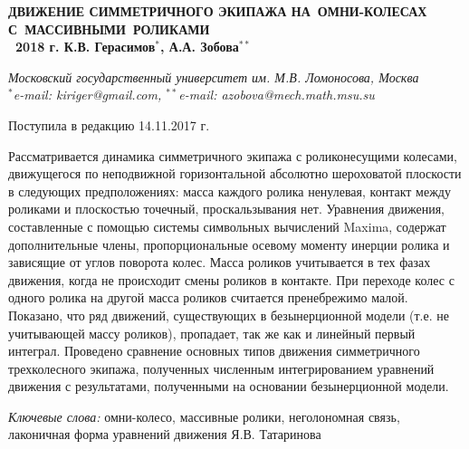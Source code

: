 \begin{center}
\large
\textbf{ ДВИЖЕНИЕ СИММЕТРИЧНОГО ЭКИПАЖА НА~ОМНИ-КОЛЕСАХ С~МАССИВНЫМИ~РОЛИКАМИ \\
\textcopyright \ 2018 г. \quad К.В. Герасимов$^{*}$, А.А. Зобова$^{**}$ }

\textit{ Московский государственный университет им. М.В. Ломоносова, Москва \\
$^*$e-mail: kiriger@gmail.com, $^{**}$e-mail: azobova@mech.math.msu.su }

Поступила в редакцию 14.11.2017 г.

\nocite{mecanum}
\nocite{ZobovaTatarinovAspecty2006}
\nocite{formalskii}
\nocite{zobova2008svobodnye8020851}
\nocite{ZobovaTatarinovPMM}
\nocite{Martynenko2010}
\nocite{borisov}
\nocite{Williams2002}
\nocite{Ashmore2002}
\nocite{Tobolar}
\nocite{KosenkoGerasimov}
\nocite{Tatarinov}
\nocite{Zobova2011}

\vspace{0.3cm}
\normalsize
\end{center}
\begin{adjustwidth}{1cm}{1cm}
\hspace{1cm} Рассматривается динамика симметричного экипажа с роликонесущими колесами, движущегося по  неподвижной горизонтальной абсолютно шероховатой плоскости в следующих предположениях: масса каждого ролика ненулевая, контакт между роликами и плоскостью точечный, проскальзывания нет. Уравнения движения, составленные с помощью системы символьных вычислений Maxima, содержат дополнительные члены, пропорциональные осевому моменту инерции ролика и зависящие от углов поворота колес. Масса роликов учитывается в тех фазах движения, когда не происходит смены роликов в контакте. При переходе колес с одного ролика на другой масса роликов считается пренебрежимо малой. Показано, что ряд движений, существующих в безынерционной модели (т.е. не учитывающей массу роликов), пропадает, так же как и линейный первый интеграл. Проведено сравнение основных типов движения симметричного трехколесного экипажа, полученных численным интегрированием уравнений движения с результатами, полученными на основании безынерционной модели.
\end{adjustwidth} 
\textit{Ключевые слова:} омни-колесо, массивные ролики, неголономная связь, лаконичная форма уравнений движения Я.В. Татаринова
\vspace{1.5cm}



